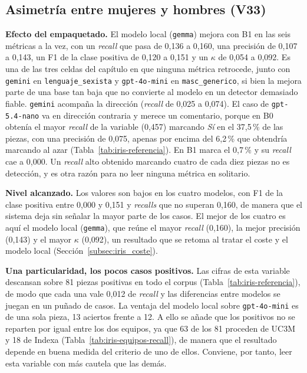 \subsection{Asimetría entre mujeres y hombres (V33)}



\textbf{Efecto del empaquetado.} El modelo local (\texttt{gemma}) mejora con B1 en las
seis métricas a
la vez, con un \textit{recall} que pasa de 0,136 a 0,160, una precisión de 0,107 a 0,143, un F1
de la clase positiva de 0,120 a 0,151 y un $\kappa$ de 0,054 a 0,092. Es una de las tres
celdas del capítulo en que ninguna métrica retrocede, junto con \texttt{gemini} en
\texttt{lenguaje\_sexista} y \texttt{gpt-4o-mini} en \texttt{masc\_generico}, si bien
la mejora parte de una base tan baja que no convierte al modelo en un detector demasiado fiable. \texttt{gemini} acompaña la
dirección (\textit{recall} de 0,025 a 0,074). El caso de \texttt{gpt-5.4-nano} va en dirección contraria y merece un
comentario, porque en B0 obtenía el mayor \textit{recall} de la variable (0,457) marcando
\textit{Sí} en el 37,5\,\% de las piezas, con una precisión de 0,075, apenas por encima
del 6,2\,\% que obtendría marcando al azar (Tabla~\ref{tab:iris-referencia}). En B1 marca el 0,7\,\% y su \textit{recall} cae a 0,000. Un \textit{recall} alto
obtenido marcando cuatro de cada diez piezas no es detección, y es otra razón para no
leer ninguna métrica en solitario.

\textbf{Nivel alcanzado.} Los valores son bajos en los cuatro modelos, con F1 de la
clase positiva entre 0,000 y 0,151 y \textit{recalls} que no superan 0,160, de manera que el
sistema deja sin señalar la mayor parte de los casos. El mejor de los cuatro es aquí el
modelo local (\texttt{gemma}), que reúne el mayor \textit{recall} (0,160), la mejor precisión
(0,143) y el mayor $\kappa$ (0,092), un resultado que se retoma al tratar el coste y el
modelo local (Sección~\ref{subsec:iris_coste}).

\textbf{Una particularidad, los pocos casos positivos.} Las cifras de esta variable descansan
sobre 81 piezas positivas en todo el corpus (Tabla~\ref{tab:iris-referencia}), de modo
que cada una vale 0,012 de \textit{recall} y las diferencias entre modelos se juegan en un puñado
de casos. La ventaja del modelo local sobre \texttt{gpt-4o-mini} es de una sola pieza,
13 aciertos frente a 12. A ello se añade que los positivos no se reparten por igual
entre los dos equipos, ya que 63 de los 81 proceden de UC3M y 18 de Indexa
(Tabla~\ref{tab:iris-equipos-recall}), de manera que el resultado depende en buena
medida del criterio de uno de ellos. Conviene, por tanto, leer esta variable con más
cautela que las demás.

